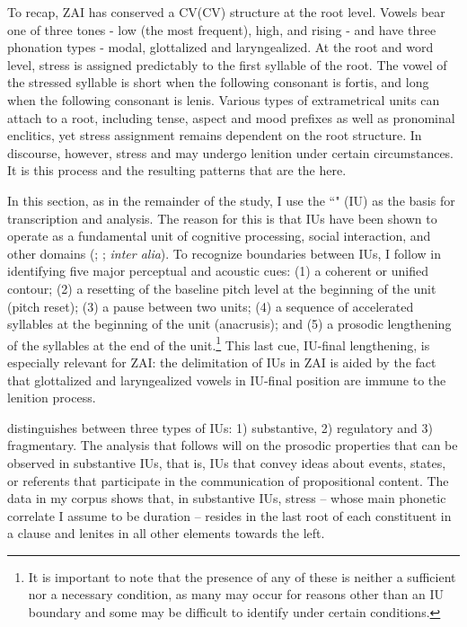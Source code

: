 To recap, ZAI has conserved a CV(CV) structure at the root level. Vowels bear one of three tones - low (the most frequent), high, and rising - and have three phonation types - modal, glottalized and laryngealized. At the root and word level, stress is assigned predictably to the first syllable of the root. The vowel of the stressed syllable is short when the following consonant is fortis, and long when the following consonant is lenis. Various types of extrametrical units can attach to a root, including tense, aspect and mood prefixes as well as pronominal enclitics, yet stress assignment remains dependent on the root structure. In discourse, however, stress and  may undergo lenition under certain circumstances. It is this process and the resulting patterns that are the  here.  

In this section, as in the remainder of the study, I use the ``" (IU) \citep{chafe1994} as the basis for transcription and analysis. The reason for this is that IUs have been shown to operate as a fundamental unit of cognitive processing, social interaction, and other domains (\citealt{chafe1994}; \citealt{dubois1993}; \textit{inter alia}). To recognize boundaries between IUs, I follow \citet[100]{dubois1993} in identifying five major perceptual and acoustic cues: 
(1) a coherent or unified  contour; 
(2) a resetting of the baseline pitch level at the beginning of the unit (pitch reset); 
(3) a pause between two units; 
(4) a sequence of accelerated syllables at the beginning of the unit (anacrusis); and 
(5) a prosodic lengthening of the syllables at the end of the unit.\footnote{It is important to note that the presence of any of these is neither a sufficient nor a necessary condition, as many may occur for reasons other than an IU boundary and some may be difficult to identify under certain conditions.} This last cue, IU-final lengthening, is especially relevant for ZAI: the delimitation of IUs in ZAI is aided by the fact that  glottalized and laryngealized vowels in IU-final position are immune to the lenition process.

\citet{chafe1994} distinguishes between three types of IUs: 1) substantive, 2) regulatory and 3) fragmentary. The analysis that follows will  on the prosodic properties that can be observed in substantive IUs, that is, IUs that convey ideas about events, states, or referents that participate in the communication of propositional content. The data in my corpus shows that, in substantive IUs, stress -- whose main phonetic correlate I assume to be duration -- resides in the last root of each constituent in a clause and lenites in all other elements towards the left. 

